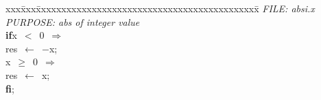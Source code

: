\documentclass{report}
\begin{document}
\pagestyle{empty}
\begin{tabbing}
xxx\=xxx\=xxxxxxxxxxxxxxxxxxxxxxxxxxxxxxxxxxxxxxxxxxxx\=\kill
{\tt{}}{\em{} FILE:     absi.x
}\\
{\tt{}}{\em{} PURPOSE:  abs of integer value
}\\
{\bf if}\>x\ $<$\ 0\ $\Rightarrow$
\\
\>res\ $\leftarrow$\ $-$x;\\
\raisebox{2pt}{\ \framebox[2pt]{\rule{0pt}{1pt}}}
\>x\ $\geq$\ 0\ $\Rightarrow$
\\
\>res\ $\leftarrow$\ x;\\
{\bf {f}{i}};
\\
\end{tabbing}
\end{document}

